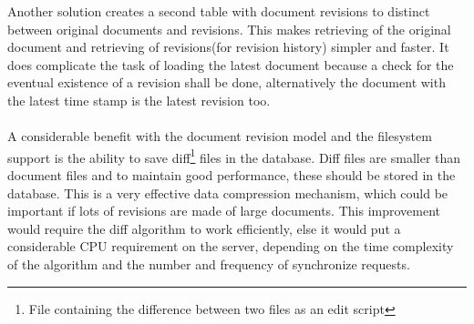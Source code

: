 \documentclass[a4paper,11pt,report]{report}
\begin{document}
		Another solution creates a second table with document revisions to distinct between original documents and revisions. This makes retrieving of the original document and retrieving of revisions(for revision history) simpler and faster. It does complicate the task of 			loading the latest document because a check for the eventual existence of a revision shall be done, alternatively the document with the latest time stamp is the latest revision too. \\ \\
		A considerable benefit with the document revision model and the filesystem support is the ability to save diff\footnote[1]{File containing the difference between two files as an edit script} files in the database. Diff files are smaller than document files and to maintain 			good performance, these should be stored in the database. This is a very effective data compression mechanism, which could be important if lots of revisions are made of large documents. This improvement would require the diff algorithm to work efficiently, 				else it would put a considerable CPU requirement on the server, depending on the time complexity of the algorithm and the number and frequency of synchronize requests.
		
\end{document}
